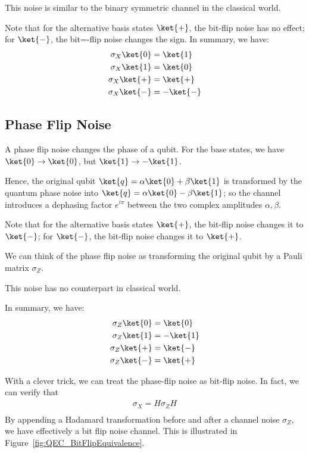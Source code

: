 This noise is similar to the binary symmetric channel in the classical world. 

Note that for the alternative basis states \(\ket{+}\), the bit-flip noise has no effect; for \(\ket{-}\), the bit=-flip noise changes the sign. 
In summary, we have:
\begin{align*}
    \sigma_X \ket{0} &= \ket{1} \\
    \sigma_X \ket{1} &= \ket{0} \\
    \sigma_X \ket{+} &= \ket{+} \\
    \sigma_X \ket{-} &= -\ket{-}
\end{align*}

\subsection {Phase Flip Noise}
A phase flip noise changes the phase of a qubit. For the base states, we have 
\(\ket{0} \rightarrow \ket{0}\), but \(\ket{1} \rightarrow - \ket{1}\).

Hence, the original qubit \(\ket{q} = \alpha \ket{0} + \beta \ket{1}\) is transformed by the quantum phase noise into \(\ket{q} = \alpha \ket{0} - \beta \ket{1}\); so the channel  introduces a dephasing factor \(e^{i\pi}\) between the two complex amplitudes \(\alpha, \beta\).

Note that for the alternative basis states \(\ket{+}\), the bit-flip noise changes it to \(\ket{-}\); for \(\ket{-}\), the bit-flip noise changes it to \(\ket{+}\). 


We can think of the phase flip noise as transforming the original qubit by a Pauli matrix \(\sigma_Z\).

This noise has no counterpart in classical world. 

In summary, we have:
\begin{align*}
    \sigma_Z \ket{0} &= \ket{0} \\
    \sigma_Z \ket{1} &= -\ket{1} \\
    \sigma_Z \ket{+} &= \ket{-} \\
    \sigma_Z \ket{-} &= \ket{+}
\end{align*}

With a clever trick, we can treat the phase-flip noise as bit-flip noise. In fact, we can verify that 
\begin{align*}
    \sigma_X = H \sigma_Z H \\
\end{align*}
By appending a Hadamard transformation before and after a channel noise \(\sigma_Z\), we have effectively a bit flip noise channel. This is illustrated in Figure~\ref{fig:QEC_BitFlipEquivalence}.

